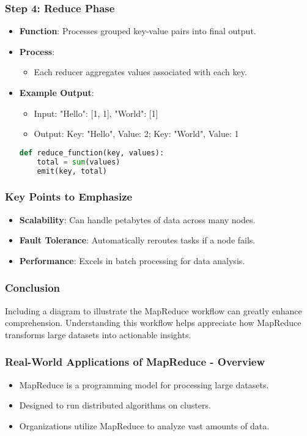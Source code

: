 \documentclass[aspectratio=169]{beamer}
\begin{document}
\begin{frame}[fragile]
  \frametitle{Step 4: Reduce Phase}
  \begin{itemize}
    \item \textbf{Function}: Processes grouped key-value pairs into final output.
    \item \textbf{Process}:
    \begin{itemize}
      \item Each reducer aggregates values associated with each key.
    \end{itemize}
    \item \textbf{Example Output}:
    \begin{itemize}
      \item Input: { "Hello": [1, 1], "World": [1] }
      \item Output: Key: "Hello", Value: 2; Key: "World", Value: 1
    \end{itemize}
    \begin{lstlisting}[language=Python]
def reduce_function(key, values):
    total = sum(values)
    emit(key, total)
    \end{lstlisting}
  \end{itemize}
\end{frame}

\begin{frame}
  \frametitle{Key Points to Emphasize}
  \begin{itemize}
    \item \textbf{Scalability}: Can handle petabytes of data across many nodes.
    \item \textbf{Fault Tolerance}: Automatically reroutes tasks if a node fails.
    \item \textbf{Performance}: Excels in batch processing for data analysis.
  \end{itemize}
\end{frame}

\begin{frame}
  \frametitle{Conclusion}
  Including a diagram to illustrate the MapReduce workflow can greatly enhance comprehension. Understanding this workflow helps appreciate how MapReduce transforms large datasets into actionable insights.
\end{frame}

\begin{frame}[fragile]
    \frametitle{Real-World Applications of MapReduce - Overview}
    \begin{itemize}
        \item MapReduce is a programming model for processing large datasets.
        \item Designed to run distributed algorithms on clusters.
        \item Organizations utilize MapReduce to analyze vast amounts of data.
    \end{itemize}
\end{frame}
\end{document}

